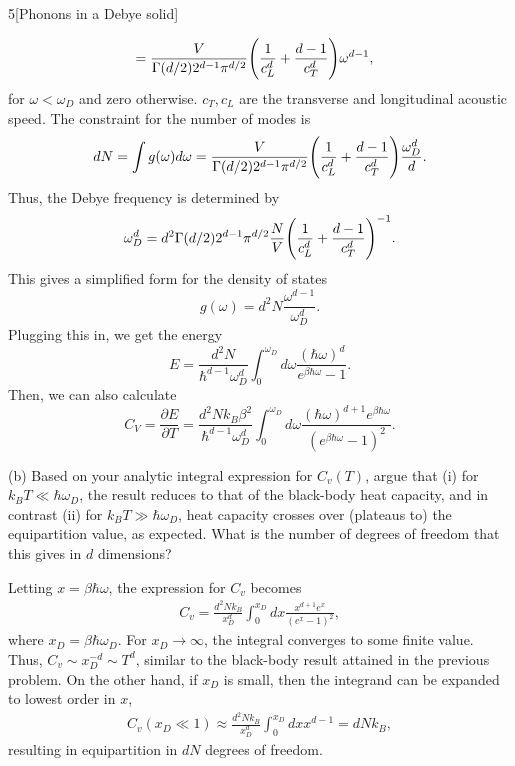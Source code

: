 \documentclass[12pt]{article}
\begin{document}
\begin{problem}{5}[Phonons in a Debye solid]
\begin{solution}
\begin{align}
    &=\frac{V}{\Gamma(d/2)2^{d-1}\pi^{d/2}}\qty(\frac1{c_L^d}+\frac{d-1}{c_T^d})\omega^{d-1},
\end{align}
for $\omega<\omega_D$ and zero otherwise. $c_T,c_L$ are the transverse
and longitudinal acoustic speed. The constraint for the number of modes is
\begin{equation}
    dN=\int g(\omega)d\omega
    =\frac{V}{\Gamma(d/2)2^{d-1}\pi^{d/2}}\qty(\frac1{c_L^d}+\frac{d-1}{c_T^d})\frac{\omega_D^d}{d}.
\end{equation}
Thus, the Debye frequency is determined by
\begin{equation}
    \omega_D^d=d^2\Gamma(d/2)2^{d-1}\pi^{d/2}\frac{N}V\qty(\frac1{c_L^d}+\frac{d-1}{c_T^d})^{-1}.
\end{equation}
This gives a simplified form for the density of states
\begin{equation}
    g(\omega)=d^2N\frac{\omega^{d-1}}{\omega_D^d}.
\end{equation}
Plugging this in, we get the energy
\begin{equation}
    E=\frac{d^2N}{\hbar^{d-1}\omega_D^d}\int_0^{\omega_D}d\omega\frac{(\hbar\omega)^d}{e^{\beta\hbar\omega}-1}.
\end{equation}
Then, we can also calculate
\begin{equation}
    C_V=\frac{\partial E}{\partial T}
    =\frac{d^2Nk_B\beta^2}{\hbar^{d-1}\omega_D^d}\int_0^{\omega_D}d\omega\frac{(\hbar\omega)^{d+1}e^{\beta\hbar\omega}}{(e^{\beta\hbar\omega}-1)^2}.
\end{equation}
\end{solution}

(b) Based on your analytic integral expression for $C_v(T)$, argue that (i) for
$k_BT\ll \hbar\omega_D$, the result reduces to that of the black-body heat
capacity, and in contrast (ii) for $k_BT\gg \hbar\omega_D$, heat capacity
crosses over (plateaus to) the equipartition value, as expected. What is the
number of degrees of freedom that this gives in $d$ dimensions?
\begin{solution}
Letting $x=\beta\hbar\omega$, the expression for $C_v$ becomes
\begin{align}\label{p5b:Cv}
    C_v=\frac{d^2Nk_B}{x_D^d}\int_0^{x_D}dx\frac{x^{d+1}e^x}{(e^x-1)^2},
\end{align}
where $x_D=\beta\hbar\omega_D$. For $x_D\to\infty$, the integral converges to
some finite value. Thus, $C_v\sim x_D^{-d}\sim T^d$, similar to the black-body
result attained in the previous problem. On the other hand, if $x_D$ is small,
then the integrand can be expanded to lowest order in $x$,
\begin{align}
    C_v(x_D\ll 1)\approx\frac{d^2Nk_B}{x_D^d}\int_0^{x_D}dx x^{d-1}
    =dNk_B,
\end{align}
resulting in equipartition in $dN$ degrees of freedom.
\end{solution}


\end{problem}
\end{document}
